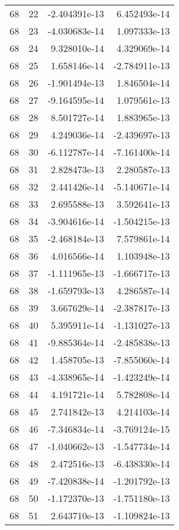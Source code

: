 \begin{tabular}{rrrr}
  68 &   22 & -2.404391e-13 &  6.452493e-14 \\
  68 &   23 & -4.030683e-14 &  1.097333e-13 \\
  68 &   24 &  9.328010e-14 &  4.329069e-14 \\
  68 &   25 &  1.658146e-14 & -2.784911e-13 \\
  68 &   26 & -1.901494e-13 &  1.846504e-14 \\
  68 &   27 & -9.164595e-14 &  1.079561e-13 \\
  68 &   28 &  8.501727e-14 &  1.883965e-13 \\
  68 &   29 &  4.249036e-14 & -2.439697e-13 \\
  68 &   30 & -6.112787e-14 & -7.161400e-14 \\
  68 &   31 &  2.828473e-13 &  2.280587e-13 \\
  68 &   32 &  2.441426e-14 & -5.140671e-14 \\
  68 &   33 &  2.695588e-13 &  3.592641e-13 \\
  68 &   34 & -3.904616e-14 & -1.504215e-13 \\
  68 &   35 & -2.468184e-13 &  7.579861e-14 \\
  68 &   36 &  4.016566e-14 &  1.103948e-13 \\
  68 &   37 & -1.111965e-13 & -1.666717e-13 \\
  68 &   38 & -1.659793e-13 &  4.286587e-14 \\
  68 &   39 &  3.667629e-14 & -2.387817e-13 \\
  68 &   40 &  5.395911e-14 & -1.131027e-13 \\
  68 &   41 & -9.885364e-14 & -2.485838e-13 \\
  68 &   42 &  1.458705e-13 & -7.855060e-14 \\
  68 &   43 & -4.338965e-14 & -1.423249e-14 \\
  68 &   44 &  4.191721e-14 &  5.782808e-14 \\
  68 &   45 &  2.741842e-13 &  4.214103e-14 \\
  68 &   46 & -7.346834e-14 & -3.769124e-15 \\
  68 &   47 & -1.040662e-13 & -1.547734e-14 \\
  68 &   48 &  2.472516e-13 & -6.438330e-14 \\
  68 &   49 & -7.420838e-14 & -1.201792e-13 \\
  68 &   50 & -1.172370e-13 & -1.751180e-13 \\
  68 &   51 &  2.643710e-13 & -1.109824e-13 \\

\end{tabular}
